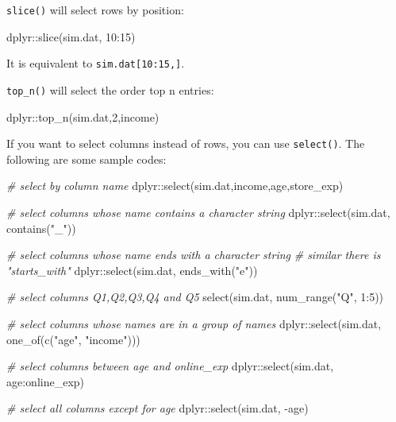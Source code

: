 \documentclass[
  12pt,
]{krantz}
\makeatletter
\newenvironment{Shaded}{\begin{snugshade}}{\end{snugshade}}
\newcommand{\CommentTok}[1]{\textcolor[rgb]{0.37,0.37,0.37}{\textit{#1}}}
\newcommand{\DecValTok}[1]{\textcolor[rgb]{0.06,0.06,0.06}{#1}}
\newcommand{\FunctionTok}[1]{\textcolor[rgb]{0,0,0}{#1}}
\newcommand{\NormalTok}[1]{#1}
\newcommand{\SpecialCharTok}[1]{\textcolor[rgb]{0,0,0}{#1}}
\newcommand{\StringTok}[1]{\textcolor[rgb]{0.5,0.5,0.5}{#1}}
\newenvironment{kframe}{%
\medskip{}
\setlength{\fboxsep}{.8em}
 \def\at@end@of@kframe{}%
 \ifinner\ifhmode%
  \def\at@end@of@kframe{\end{minipage}}%
  \begin{minipage}{\columnwidth}%
 \fi\fi%
 \def\FrameCommand##1{\hskip\@totalleftmargin \hskip-\fboxsep
 \colorbox{shadecolor}{##1}\hskip-\fboxsep
     \hskip-\linewidth \hskip-\@totalleftmargin \hskip\columnwidth}%
 \MakeFramed {\advance\hsize-\width
   \@totalleftmargin\z@ \linewidth\hsize
   \@setminipage}}%
 {\par\unskip\endMakeFramed%
 \at@end@of@kframe}
\renewenvironment{Shaded}{\begin{kframe}}{\end{kframe}}
\makeatother
\begin{document}
\texttt{slice()} will select rows by position:

\begin{Shaded}
\begin{Highlighting}[]
\NormalTok{dplyr}\SpecialCharTok{::}\FunctionTok{slice}\NormalTok{(sim.dat, }\DecValTok{10}\SpecialCharTok{:}\DecValTok{15}\NormalTok{) }
\end{Highlighting}
\end{Shaded}

It is equivalent to \texttt{sim.dat{[}10:15,{]}}.

\texttt{top\_n()} will select the order top n entries:

\begin{Shaded}
\begin{Highlighting}[]
\NormalTok{dplyr}\SpecialCharTok{::}\FunctionTok{top\_n}\NormalTok{(sim.dat,}\DecValTok{2}\NormalTok{,income)}
\end{Highlighting}
\end{Shaded}

If you want to select columns instead of rows, you can use \texttt{select()}. The following are some sample codes:

\begin{Shaded}
\begin{Highlighting}[]
\CommentTok{\# select by column name}
\NormalTok{dplyr}\SpecialCharTok{::}\FunctionTok{select}\NormalTok{(sim.dat,income,age,store\_exp)}

\CommentTok{\# select columns whose name contains a character string}
\NormalTok{dplyr}\SpecialCharTok{::}\FunctionTok{select}\NormalTok{(sim.dat, }\FunctionTok{contains}\NormalTok{(}\StringTok{"\_"}\NormalTok{))}

\CommentTok{\# select columns whose name ends with a character string}
\CommentTok{\# similar there is "starts\_with"}
\NormalTok{dplyr}\SpecialCharTok{::}\FunctionTok{select}\NormalTok{(sim.dat, }\FunctionTok{ends\_with}\NormalTok{(}\StringTok{"e"}\NormalTok{))}

\CommentTok{\# select columns Q1,Q2,Q3,Q4 and Q5}
\FunctionTok{select}\NormalTok{(sim.dat, }\FunctionTok{num\_range}\NormalTok{(}\StringTok{"Q"}\NormalTok{, }\DecValTok{1}\SpecialCharTok{:}\DecValTok{5}\NormalTok{)) }

\CommentTok{\# select columns whose names are in a group of names}
\NormalTok{dplyr}\SpecialCharTok{::}\FunctionTok{select}\NormalTok{(sim.dat, }\FunctionTok{one\_of}\NormalTok{(}\FunctionTok{c}\NormalTok{(}\StringTok{"age"}\NormalTok{, }\StringTok{"income"}\NormalTok{)))}

\CommentTok{\# select columns between age and online\_exp}
\NormalTok{dplyr}\SpecialCharTok{::}\FunctionTok{select}\NormalTok{(sim.dat, age}\SpecialCharTok{:}\NormalTok{online\_exp)}

\CommentTok{\# select all columns except for age}
\NormalTok{dplyr}\SpecialCharTok{::}\FunctionTok{select}\NormalTok{(sim.dat, }\SpecialCharTok{{-}}\NormalTok{age)}
\end{Highlighting}
\end{Shaded}
\end{document}

